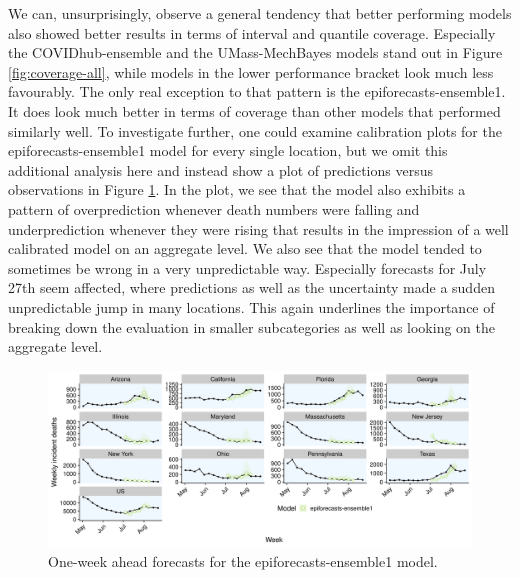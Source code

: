 \documentclass[
]{book}
\begin{document}
We can, unsurprisingly, observe a general tendency that better performing models also showed better results in terms of interval and quantile coverage. Especially the COVIDhub-ensemble and the UMass-MechBayes models stand out in Figure \ref{fig:coverage-all}, while models in the lower performance bracket look much less favourably. The only real exception to that pattern is the epiforecasts-ensemble1. It does look much better in terms of coverage than other models that performed similarly well. To investigate further, one could examine calibration plots for the epiforecasts-ensemble1 model for every single location, but we omit this additional analysis here and instead show a plot of predictions versus observations in Figure \ref{fig:epiforecasts-ensemble1}. In the plot, we see that the model also exhibits a pattern of overprediction whenever death numbers were falling and underprediction whenever they were rising that results in the impression of a well calibrated model on an aggregate level. We also see that the model tended to sometimes be wrong in a very unpredictable way. Especially forecasts for July 27th seem affected, where predictions as well as the uncertainty made a sudden unpredictable jump in many locations. This again underlines the importance of breaking down the evaluation in smaller subcategories as well as looking on the aggregate level.

\begin{figure}
\includegraphics[width=1\linewidth]{../visualisation/chapter-5-results/scenario-baseline/APPENDIX-epiforecasts-ensemble1-forecasts} \caption{One-week ahead forecasts for the epiforecasts-ensemble1 model.}\label{fig:epiforecasts-ensemble1}
\end{figure}
\end{document}
